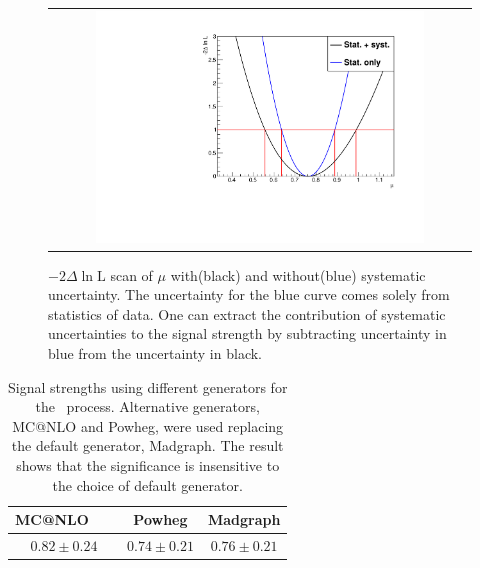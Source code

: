 %
\begin{figure}[htp] 
\centering 
\begin{tabular}{c} 
\includegraphics[width=0.8\textwidth]{figures/MuDeltaNLL.pdf}
\end{tabular} 
\caption{ $- 2\Delta\ln \textrm{L}$ scan of $\mu$ with(black) 
and without(blue) systematic uncertainty.
The uncertainty for the blue curve comes solely from statistics of data.
One can extract the contribution of systematic uncertainties to the signal strength
by subtracting uncertainty in blue from the uncertainty in black.} 
\label{fig:mu_scan} 
\end{figure} 

%
\begin{table}[htp] 
\begin{center} 
\begin{tabular}{c|c|c} 
\hline 
MC@NLO   &  Powheg & Madgraph \\
\hline \hline 
$0.82 \pm 0.24$ & $0.74 \pm 0.21$ & $0.76 \pm 0.21$ \\
\hline 
\end{tabular} 
\caption{ Signal strengths 
using different generators for the \qqww\ process. Alternative generators,
MC@NLO and Powheg, were used replacing the default generator, Madgraph.
The result shows that the significance is insensitive to the choice
of default generator.} 
\label{tab:mu_diffgenerator} 
\end{center} 
\end{table} 



